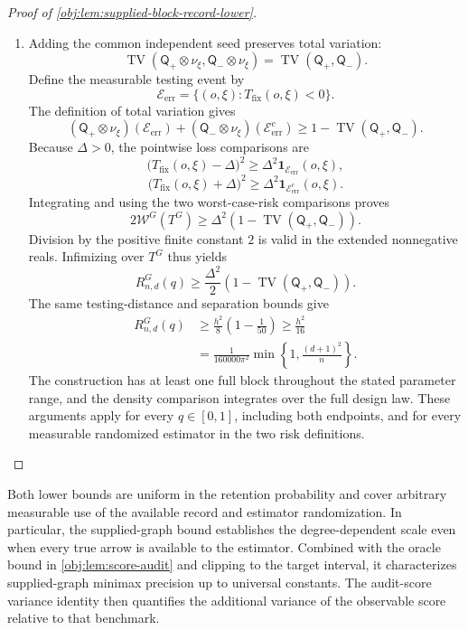 \documentclass[11pt]{article}
\begin{document}
\begin{proof}[Proof of \cref{obj:lem:supplied-block-record-lower}]
\begin{enumerate}
\item Adding the common independent seed preserves total variation:
\[
\operatorname{TV}
(\mathsf Q_+\otimes\nu_\xi,\mathsf Q_-\otimes\nu_\xi)
=
\operatorname{TV}(\mathsf Q_+,\mathsf Q_-).
\]
Define the measurable testing event by
\[
\mathcal E_{\mathrm{err}}
=
\{(o,\xi):T_{\mathrm{fix}}(o,\xi)<0\}.
\]
The definition of total variation gives
\[
(\mathsf Q_+\otimes\nu_\xi)(\mathcal E_{\mathrm{err}})
+
(\mathsf Q_-\otimes\nu_\xi)(\mathcal E_{\mathrm{err}}^c)
\ge
1-\operatorname{TV}(\mathsf Q_+,\mathsf Q_-).
\]
Because \(\Delta>0\), the pointwise loss comparisons are
\[
\bigl(T_{\mathrm{fix}}(o,\xi)-\Delta\bigr)^2
\ge\Delta^2\mathbf1_{\mathcal E_{\mathrm{err}}}(o,\xi),
\]
\[
\bigl(T_{\mathrm{fix}}(o,\xi)+\Delta\bigr)^2
\ge\Delta^2\mathbf1_{\mathcal E_{\mathrm{err}}^c}(o,\xi).
\]
Integrating and using the two worst-case-risk comparisons proves
\[
2\mathcal W^G(T^G)
\ge
\Delta^2\left(1-\operatorname{TV}(\mathsf Q_+,\mathsf Q_-)\right).
\]
Division by the positive finite constant \(2\) is valid in the extended nonnegative reals. Infimizing over \(T^G\) thus yields
\[
R^G_{n,d}(q)
\ge
\frac{\Delta^2}{2}
\left(1-\operatorname{TV}(\mathsf Q_+,\mathsf Q_-)\right).
\]
The same testing-distance and separation bounds give
\[
\begin{aligned}
R^G_{n,d}(q)
&\ge
\frac{h^2}{8}\left(1-\frac1{50}\right)
\ge\frac{h^2}{16}\\
&=
\frac{1}{160000\pi^2}
\min\left\{1,\frac{(d+1)^2}{n}\right\}.
\end{aligned}
\]
The construction has at least one full block throughout the stated parameter range, and the density comparison integrates over the full design law. These arguments apply for every \(q\in[0,1]\), including both endpoints, and for every measurable randomized estimator in the two risk definitions.
\end{enumerate}
\end{proof}

Both lower bounds are uniform in the retention probability and cover arbitrary measurable use of the available record and estimator randomization. In particular, the supplied-graph bound establishes the degree-dependent scale even when every true arrow is available to the estimator. Combined with the oracle bound in \cref{obj:lem:score-audit} and clipping to the target interval, it characterizes supplied-graph minimax precision up to universal constants. The audit-score variance identity then quantifies the additional variance of the observable score relative to that benchmark.
\end{document}
